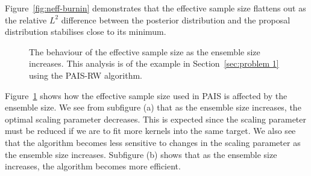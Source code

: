 \documentclass[final]{siamltex}
\begin{document}
Figure~\ref{fig:neff-burnin} demonstrates that the effective sample
size flattens out as the relative $L^2$ difference between the
posterior distribution and the proposal distribution stabilises close
to its minimum.

\begin{figure}[htb]
\centering
{}
\caption{The behaviour of the effective sample size as the ensemble size increases. This analysis is of the example in Section~\ref{sec:problem 1} using the PAIS-RW algorithm.}
\label{fig:neff-M}
\end{figure}

Figure~\ref{fig:neff-M} shows how the effective sample size used in
PAIS is affected by the ensemble size. We see from subfigure (a) that
as the ensemble size increases, the optimal scaling parameter
decreases. This is expected since the scaling parameter must be
reduced if we are to fit more kernels into the same target. We also
see that the algorithm becomes less sensitive to changes in the
scaling parameter as the ensemble size increases. Subfigure (b) shows
that as the ensemble size increases, the algorithm becomes more
efficient.
\end{document}
